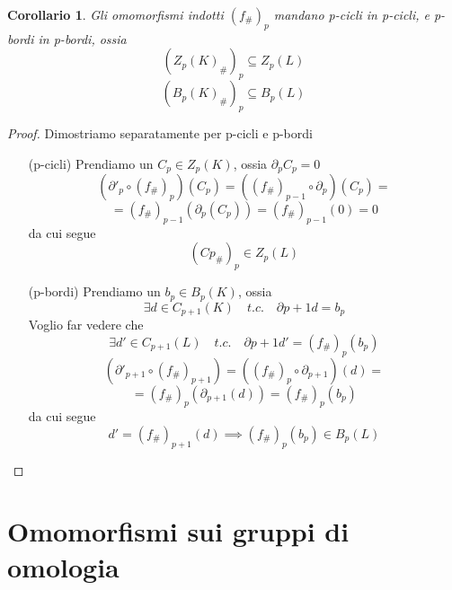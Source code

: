\documentclass[a4paper]{report}
\newtheorem{corollary}{Corollario}
\newcommand{\shrp}[1]{\ensuremath{({#1}_\#)_p}}
\begin{document}
\begin{corollary}
    Gli omomorfismi indotti $\shrp{f}$ mandano p-cicli in p-cicli, e p-bordi in p-bordi, ossia
    \[
        \shrp{Z_p(K)}\subseteq Z_p(L)
    \]
    \[
        \shrp{B_p(K)}\subseteq B_p(L)
    \]
\end{corollary}
\begin{proof}
    Dimostriamo separatamente per p-cicli e p-bordi
    \begin{itemize}
        \item[(p-cicli)] Prendiamo un $C_p\in Z_p(K)$, ossia $\partial_pC_p=0$
            \[
                \left(\partial'_p\circ\shrp{f}\right)(C_p)=\left((f_\#)_{p-1}\circ\partial_p\right)(C_p)=
            \]
            \[
                =(f_\#)_{p-1}(\partial_p(C_p))=(f_\#)_{p-1}(0)=0
            \]
            da cui segue
            \[
                \shrp{Cp}\in Z_p(L)
            \]
        \item[(p-bordi)] Prendiamo un $b_p\in B_p(K)$, ossia
            \[
                \exists d\in C_{p+1}(K)\quad t.c.\quad \partial{p+1}d=b_p
            \]
            Voglio far vedere che
            \[
                \exists d'\in C_{p+1}(L)\quad t.c.\quad \partial{p+1}d'=\shrp{f}(b_p)
            \]
            \[
                \left(\partial'_{p+1}\circ(f_\#)_{p+1}\right)=\left(\shrp{f}\circ\partial_{p+1}\right)(d)=
            \]
            \[
                =\shrp{f}(\partial_{p+1}(d))=\shrp{f}(b_p)
            \]
            da cui segue
            \[
                d'=(f_\#)_{p+1}(d)\implies (f_\#)_p(b_p)\in B_p(L)
            \]
    \end{itemize}
\end{proof}
\newpage
\section{Omomorfismi sui gruppi di omologia}
\end{document}
